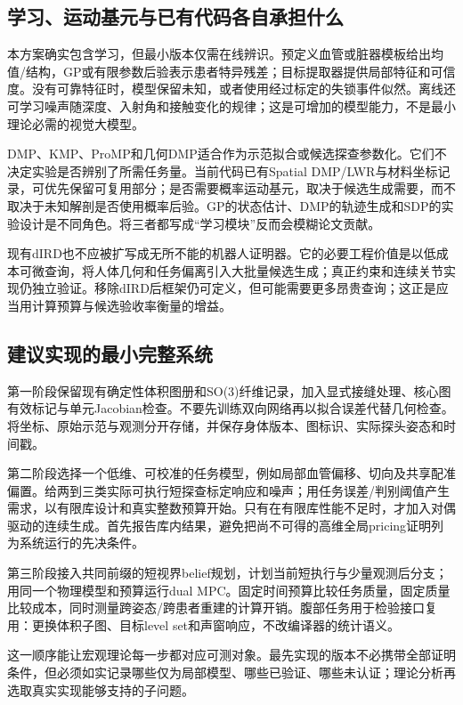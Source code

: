 \documentclass[11pt,a4paper]{article}
\numberwithin{equation}{section}
\theoremstyle{definition}
\begin{document}
\subsection{学习、运动基元与已有代码各自承担什么}
本方案确实包含学习，但最小版本仅需在线辨识。预定义血管或脏器模板给出均值/结构，GP或有限参数后验表示患者特异残差；目标提取器提供局部特征和可信度。没有可靠特征时，模型保留未知，或者使用经过标定的失锁事件似然。离线还可学习噪声随深度、入射角和接触变化的规律；这是可增加的模型能力，不是最小理论必需的视觉大模型。

DMP、KMP、ProMP和几何DMP适合作为示范拟合或候选探查参数化。它们不决定实验是否辨别了所需任务量。当前代码已有Spatial DMP/LWR与材料坐标记录，可优先保留可复用部分；是否需要概率运动基元，取决于候选生成需要，而不取决于未知解剖是否使用概率后验。GP的状态估计、DMP的轨迹生成和SDP的实验设计是不同角色。将三者都写成“学习模块”反而会模糊论文贡献。

现有dIRD也不应被扩写成无所不能的机器人证明器。它的必要工程价值是以低成本可微查询，将人体几何和任务偏离引入大批量候选生成；真正约束和连续关节实现仍独立验证。移除dIRD后框架仍可定义，但可能需要更多昂贵查询；这正是应当用计算预算与候选验收率衡量的增益。

\subsection{建议实现的最小完整系统}
第一阶段保留现有确定性体积图册和SO(3)纤维记录，加入显式接缝处理、核心图有效标记与单元Jacobian检查。不要先训练双向网络再以拟合误差代替几何检查。将坐标、原始示范与观测分开存储，并保存身体版本、图标识、实际探头姿态和时间戳。

第二阶段选择一个低维、可校准的任务模型，例如局部血管偏移、切向及共享配准偏置。给两到三类实际可执行短探查标定响应和噪声；用任务误差/判别阈值产生需求，以有限库设计和真实整数预算开始。只有在有限库性能不足时，才加入对偶驱动的连续生成。首先报告库内结果，避免把尚不可得的高维全局pricing证明列为系统运行的先决条件。

第三阶段接入共同前缀的短视界belief规划，计划当前短执行与少量观测后分支；用同一个物理模型和预算运行dual MPC。固定时间预算比较任务质量，固定质量比较成本，同时测量跨姿态/跨患者重建的计算开销。腹部任务用于检验接口复用：更换体积子图、目标level set和声窗响应，不改编译器的统计语义。

这一顺序能让宏观理论每一步都对应可测对象。最先实现的版本不必携带全部证明条件，但必须如实记录哪些仅为局部模型、哪些已验证、哪些未认证；理论分析再选取真实实现能够支持的子问题。
\end{document}

